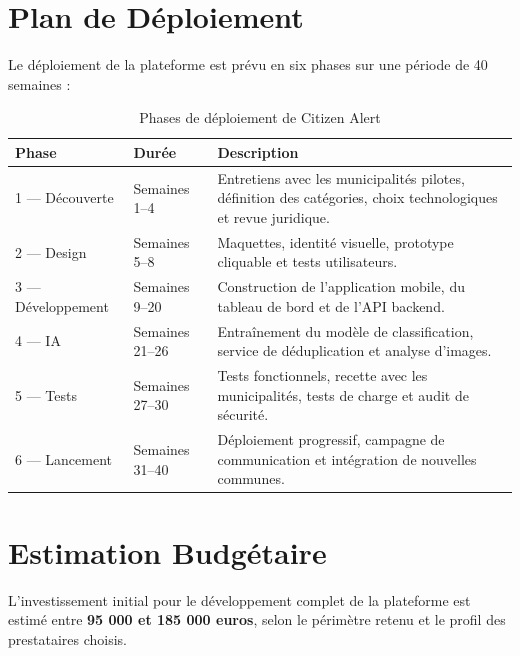 \documentclass[12pt, a4paper]{article}
\begin{document}
\section{Plan de Déploiement}

Le déploiement de la plateforme est prévu en six phases sur une période de 40 semaines :

\begin{table}[h!]
\centering
\begin{tabularx}{\textwidth}{llX}
\toprule
\textbf{Phase} & \textbf{Durée} & \textbf{Description} \\
\midrule
1 — Découverte       & Semaines 1–4   & Entretiens avec les municipalités pilotes, définition des catégories, choix technologiques et revue juridique. \\[4pt]
2 — Design           & Semaines 5–8   & Maquettes, identité visuelle, prototype cliquable et tests utilisateurs. \\[4pt]
3 — Développement    & Semaines 9–20  & Construction de l'application mobile, du tableau de bord et de l'API backend. \\[4pt]
4 — IA               & Semaines 21–26 & Entraînement du modèle de classification, service de déduplication et analyse d'images. \\[4pt]
5 — Tests            & Semaines 27–30 & Tests fonctionnels, recette avec les municipalités, tests de charge et audit de sécurité. \\[4pt]
6 — Lancement        & Semaines 31–40 & Déploiement progressif, campagne de communication et intégration de nouvelles communes. \\
\bottomrule
\end{tabularx}
\caption{Phases de déploiement de Citizen Alert}
\end{table}

\section{Estimation Budgétaire}

L'investissement initial pour le développement complet de la plateforme est estimé entre \textbf{95 000 et 185 000 euros}, selon le périmètre retenu et le profil des prestataires choisis.
\end{document}

